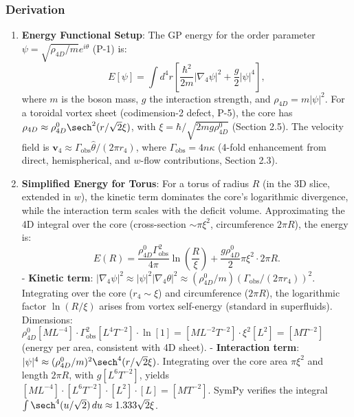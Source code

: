 \subsubsection{Derivation}
\begin{enumerate}
\item \textbf{Energy Functional Setup}: The GP energy for the order parameter $\psi = \sqrt{\rho_{4D}/m} e^{i \theta}$ (P-1) is:
   \[
   E[\psi] = \int d^4 r \left[ \frac{\hbar^2}{2 m} |\nabla_4 \psi|^2 + \frac{g}{2} |\psi|^4 \right],
   \]
   where $m$ is the boson mass, $g$ the interaction strength, and $\rho_{4D} = m |\psi|^2$. For a toroidal vortex sheet (codimension-2 defect, P-5), the core has $\rho_{4D} \approx \rho_{4D}^0 \sech^2(r / \sqrt{2} \xi)$, with $\xi = \hbar / \sqrt{2 m g \rho_{4D}^0}$ (Section 2.5). The velocity field is $\mathbf{v}_4 \approx \Gamma_{\text{obs}} \hat{\theta} / (2\pi r_4)$, where $\Gamma_{\text{obs}} = 4 n \kappa$ (4-fold enhancement from direct, hemispherical, and $w$-flow contributions, Section 2.3).

\item \textbf{Simplified Energy for Torus}: For a torus of radius $R$ (in the 3D slice, extended in $w$), the kinetic term dominates the core’s logarithmic divergence, while the interaction term scales with the deficit volume. Approximating the 4D integral over the core (cross-section $\sim \pi \xi^2$, circumference $2\pi R$), the energy is:
   \[
   E(R) = \frac{\rho_{4D}^0 \Gamma_{\text{obs}}^2}{4\pi} \ln\left(\frac{R}{\xi}\right) + \frac{g \rho_{4D}^0}{2} \pi \xi^2 \cdot 2\pi R.
   \]
   - \textbf{Kinetic term}: $|\nabla_4 \psi|^2 \approx |\psi|^2 |\nabla_4 \theta|^2 \approx (\rho_{4D}^0 / m) (\Gamma_{\text{obs}} / (2\pi r_4))^2$. Integrating over the core ($r_4 \sim \xi$) and circumference ($2\pi R$), the logarithmic factor $\ln(R/\xi)$ arises from vortex self-energy (standard in superfluids). Dimensions: $\rho_{4D}^0 [M L^{-4}] \cdot \Gamma_{\text{obs}}^2 [L^4 T^{-2}] \cdot \ln [1] = [M L^{-2} T^{-2}] \cdot \xi^2 [L^2] = [M T^{-2}]$ (energy per area, consistent with 4D sheet).
   - \textbf{Interaction term}: $|\psi|^4 \approx (\rho_{4D}^0 / m)^2 \sech^4(r / \sqrt{2} \xi)$. Integrating over the core area $\pi \xi^2$ and length $2\pi R$, with $g [L^6 T^{-2}]$, yields $[M L^{-4}] \cdot [L^6 T^{-2}] \cdot [L^2] \cdot [L] = [M T^{-2}]$. SymPy verifies the integral $\int \sech^4(u / \sqrt{2}) \, du \approx 1.333 \sqrt{2} \xi$.


\end{enumerate}
